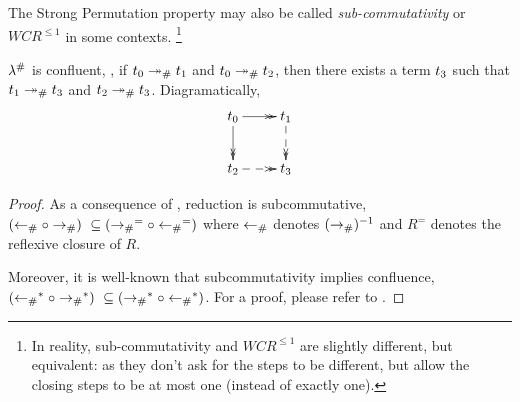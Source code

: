 The Strong Permutation property may also be called \emph{sub-commutativity}
or \emph{$WCR^{\leq 1}$} in some contexts.
\footnote{In reality, sub-commutativity and $WCR^{\leq 1}$ are slightly different,
but equivalent:
as they don't ask for the steps to be different,
but allow the closing steps to be at most one (instead of exactly one).}

\begin{corollary}[Confluence]
$\lambda^{\mathtt{\#}}$ is confluent, \ie,
if $t_0 \mathrel{\mathrel{\twoheadrightarrow}_{\mathtt{\#}}} t_1$ and $t_0 \mathrel{\mathrel{\twoheadrightarrow}_{\mathtt{\#}}} t_2$, then there exists a term $t_3$
such that $t_1 \mathrel{\mathrel{\twoheadrightarrow}_{\mathtt{\#}}} t_3$ and $t_2 \mathrel{\mathrel{\twoheadrightarrow}_{\mathtt{\#}}} t_3$.
Diagramatically,
\[
    \xymatrix{
      \tm_0 \ar@{->>}[d]
            \ar@{->>}[r] &
      \tm_1 \ar@{-->>}[d] \\
            \ar@{-->>}[r]
      \tm_2 &
      \tm_3 \\
    }
\]
\end{corollary}
\begin{proof}
As a consequence of
,
reduction is subcommutative,
\ie $(\mathrel{\leftarrow_{\mathtt{\#}}} \circ \mathrel{\to_{\mathtt{\#}}})\ \subseteq (\mathrel{\to_{\mathtt{\#}}}^= \circ \mathrel{\leftarrow_{\mathtt{\#}}}^=)$
where
$\mathrel{\leftarrow_{\mathtt{\#}}}$ denotes $(\mathrel{\to_{\mathtt{\#}}})^{-1}$
and $R^=$ denotes the reflexive closure of $R$.

Moreover, it is well-known that subcommutativity implies confluence,
\ie $(\mathrel{\leftarrow_{\mathtt{\#}}}^* \circ \mathrel{\to_{\mathtt{\#}}}^*)\ \subseteq (\mathrel{\to_{\mathtt{\#}}}^* \circ \mathrel{\leftarrow_{\mathtt{\#}}}^*)$.
For a proof, please refer to \cite[Proposition 1.1.10]{Terese}.
\end{proof}



